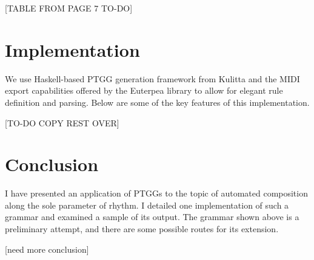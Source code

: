 \documentclass{article}
\begin{document}
[TABLE FROM PAGE 7 TO-DO]

\section{Implementation}

We use Haskell-based PTGG generation framework from Kulitta and the MIDI export capabilities offered by the Euterpea library \cite{euterpea} to allow for elegant rule definition and parsing. Below are some of the key features of this implementation.

[TO-DO COPY REST OVER]


\section{Conclusion}

I have presented an application of PTGGs to the topic of automated composition along the sole parameter of rhythm. I detailed one implementation of such a grammar and examined a sample of its output. The grammar shown above is a preliminary attempt, and there are some possible routes for its extension. 

[need more conclusion]
\end{document}
